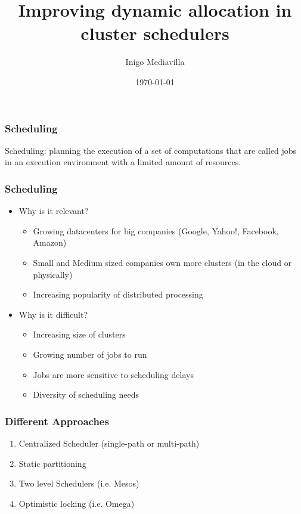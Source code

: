 \documentclass[notes=hide]{beamer}
\title{Improving dynamic allocation in cluster schedulers}
\author{Inigo Mediavilla}
\date\today
\begin{document}
  \begin{frame}
  \titlepage
  \end{frame}
  
  \note{}

  \begin{frame}
    \frametitle{Scheduling}
    \begin{definition}{Scheduling:}
    planning the execution of a set of computations that
    are called jobs in an execution environment with a limited amount
    of resources.
    \end{definition}
  \end{frame}

  \note{}

  \begin{frame}
    \frametitle{Scheduling}
    \begin{itemize}
      \item Why is it relevant?
      \begin{itemize}
        \item Growing datacenters for big companies (Google, Yahoo!,
          Facebook, Amazon)
        \item Small and Medium sized companies own more clusters (in
          the cloud or physically)  
        \item Increasing popularity of distributed processing
      \end{itemize}
    \end{itemize}
    \begin{itemize}
      \item Why is it difficult?
        \begin{itemize}
          \item Increasing size of clusters
          \item Growing number of jobs to run
          \item Jobs are more sensitive to scheduling delays
          \item Diversity of scheduling needs
        \end{itemize}
     \end{itemize}
  \end{frame}

  \note{}

  \begin{frame}
    \frametitle{Different Approaches}
    \begin{enumerate}
      \item Centralized Scheduler (single-path or multi-path)
      \item Static partitioning
      \item Two level Schedulers (i.e. Mesos)
      \item Optimistic locking (i.e. Omega)
    \end{enumerate}
  \end{frame}
\end{document}
